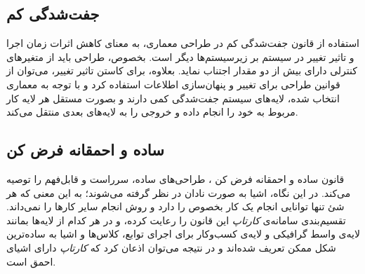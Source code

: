 \subsection{جفت‌شدگی کم}
استفاده از قانون جفت‌شدگی کم در طراحی معماری، به معنای کاهش اثرات زمان اجرا و تاثیر تغییر در سیستم بر زیرسیستم‌ها دیگر است. بخصوص، طراحی باید از متغیر‌های کنترلی دارای بیش از دو مقدار اجتناب نماید. بعلاوه، برای کاستن تاثیر تغییر، می‌توان از قوانین طراحی برای تغییر و پنهان‌سازی اطلاعات استفاده کرد و با توجه به معماری  انتخاب شده، لایه‌های سیستم جفت‌شدگی کمی دارند و بصورت مستقل هر لایه کار مربوط به خود را انجام داده و خروجی را به لایه‌های بعدی منتقل می‌کند.

\subsection{ساده و احمقانه فرض کن}
قانون ساده و احمقانه فرض کن
، طراحی‌های ساده، سرراست و قابل‌فهم را توصیه می‌کند. در این نگاه، اشیا به صورت نادان در نظر گرفته می‌شوند؛ به این معنی که هر شئ تنها توانایی انجام یک کار بخصوص را دارد و روش انجام سایر کار‌ها را نمی‌داند. تقسیم‌بندی سامانه‌ی \textit{کارتاپ} این قانون را رعایت کرده، و در هر کدام از لایه‌ها بمانند لایه‌ی واسط گرافیکی و لایه‌ی کسب‌وکار برای اجرای توابع، کلاس‌ها و اشیا به ساده‌ترین شکل ممکن تعریف شده‌اند و در نتیجه می‌توان اذعان کرد که \textit{کارتاپ} دارای اشیای احمق است.

